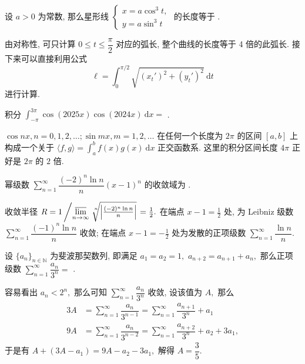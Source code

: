 \begin{question}
设 $a > 0$ 为常数, 那么星形线 $\begin{cases}
x = a \cos^3 t, \\ y = a \sin^3 t
\end{cases}$ 的长度等于 \fillin[$6a$].
\end{question}

\begin{solution}
由对称性, 可只计算 $0 \leqslant t \leqslant \dfrac{\pi}{2}$ 对应的弧长, 整个曲线的长度等于 4 倍的此弧长. 接下来可以直接利用公式
$$\ell = \int_0^{\pi/2} \sqrt{(x_t')^2 + (y_t')^2} ~ \mathrm{d} t$$
进行计算.
\end{solution}

\begin{question}
积分 $\displaystyle \int_{-\pi}^{3\pi} \cos (2025 x) \cos(2024 x) ~ \mathrm{d} x =$ \fillin[$0$].
\end{question}

\begin{solution}
$\cos nx, n = 0, 1, 2, \dots; \sin m x, m = 1, 2, \dots$ 在任何一个长度为 $2\pi$ 的区间 $[a,b]$ 上构成一个关于 $\langle f, g \rangle = \int_{a}^{b} f(x)g (x) ~ \mathrm{d} x$ 正交函数系. 这里的积分区间长度 $4\pi$ 正好是 $2\pi$ 的 $2$ 倍.
\end{solution}

\begin{question}
幂级数 $\sum\limits_{n=1}^{\infty} \dfrac{(-2)^n \ln n}{n} (x - 1)^n$ 的收敛域为 \fillin[ ${\left( \frac{1}{2}, \frac{3}{2} \right]}$ ].
\end{question}

\begin{solution}
收敛半径 $R = 1 \left/ \varlimsup\limits_{n\to\infty} \nroot[n]{\left|\frac{(-2)^n \ln n}{n}\right|} \right. = \frac{1}{2}.$ 在端点 $x - 1 = \frac{1}{2}$ 处, 为 Leibniz 级数 $\sum\limits_{n=1}^{\infty} \dfrac{(-1)^n \ln n}{n}$ 收敛; 在端点 $x - 1 = -\frac{1}{2}$ 处为发散的正项级数 $\sum\limits_{n=1}^{\infty} \dfrac{\ln n}{n}.$
\end{solution}

\begin{question}
设 $\{a_n\}_{n\in\mathbb{N}}$ 为斐波那契数列, 即满足 $a_1=a_2=1,$ $a_{n+2} = a_{n+1}+a_n,$ 那么正项级数 $\displaystyle \sum_{n=1}^{\infty} \dfrac{a_n}{3^n} = $ \fillin[$\frac{3}{5}$].
\end{question}

\begin{solution}
容易看出 $a_n < 2^n,$ 那么可知 $\displaystyle \sum_{n=1}^{\infty} \dfrac{a_n}{3^n}$ 收敛, 设该值为 $A,$ 那么
\begin{align*}
3A & = \sum_{n=1}^{\infty} \dfrac{a_n}{3^{n-1}} = \sum_{n=1}^{\infty} \dfrac{a_{n+1}}{3^{n}} + a_1 \\
9A & = \sum_{n=1}^{\infty} \dfrac{a_n}{3^{n-2}} = \sum_{n=1}^{\infty} \dfrac{a_{n+2}}{3^{n}} + a_2 + 3a_1,
\end{align*}
于是有 $A + (3A - a_1) = 9A - a_2 - 3a_1,$ 解得 $A = \dfrac{3}{5}.$
\end{solution}


